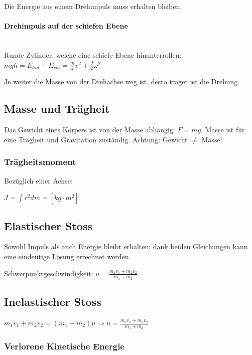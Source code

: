 \documentclass[a4paper]{scrartcl}
\begin{document}
	Die Energie aus einem Drehimpuls muss erhalten bleiben.
	
	
	\paragraph{Drehimpuls auf der schiefen Ebene} \hfill \\
	
	Runde Zylinder, welche eine schiefe Ebene hinunterrollen: $mgh = E_{kin} + E_{rot} =\frac{m}{2} v^2 + \frac{J}{2} \omega^2$
	
	Je weiter die Masse von der Drehachse weg ist, desto träger ist die Drehung.
	

\subsection{Masse und Trägheit}
	Das Gewicht eines Körpers ist von der Masse abhängig: $F = mg$.
	Masse ist für eine Trägheit und Gravitation zuständig. Achtung: Gewicht $\neq$ Masse!



\subsubsection{Trägheitsmoment}

	
	Bezüglich einer Achse:
	
	$J = \int r^2 d m = \left[ kg \cdot m^2 \right]$

\subsection{Elastischer Stoss}
	Sowohl Impuls als auch Energie bleibt erhalten; dank beiden Gleichungen kann eine eindeutige Lösung errechnet werden.
	
	Schwerpunktgeschwindigkeit: $u = \frac{m_1 v_1 + m_2 v_2}{m_1 + m_2}$ %


\subsection{Inelastischer Stoss}

	$m_1 v_1 + m_2 v_2 = (m_1 + m_2) u \Rightarrow u = \frac{m_1 v_1 + m_2 v_2}{m_1 + m_2}$

\subsubsection{Verlorene Kinetische Energie}
\end{document}
